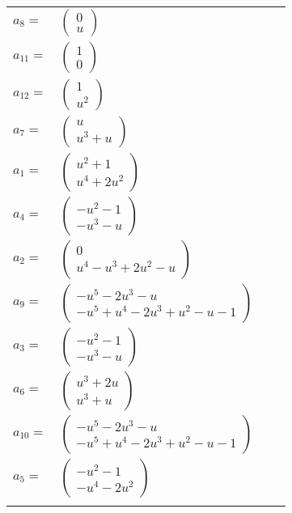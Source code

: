 \documentclass[1p]{elsarticle_modified}
\theoremstyle{definition}
\begin{document}
\begin{tabular}{m{7pt} m{180pt} m{7pt} m{180pt} }
\flushright $a_{8}=$&$\begin{pmatrix}0\\u\end{pmatrix}$ \\
\flushright $a_{11}=$&$\begin{pmatrix}1\\0\end{pmatrix}$ \\
\flushright $a_{12}=$&$\begin{pmatrix}1\\u^2\end{pmatrix}$ \\
\flushright $a_{7}=$&$\begin{pmatrix}u\\u^3+u\end{pmatrix}$ \\
\flushright $a_{1}=$&$\begin{pmatrix}u^2+1\\u^4+2 u^2\end{pmatrix}$ \\
\flushright $a_{4}=$&$\begin{pmatrix}- u^2-1\\- u^3- u\end{pmatrix}$ \\
\flushright $a_{2}=$&$\begin{pmatrix}0\\u^4- u^3+2 u^2- u\end{pmatrix}$ \\
\flushright $a_{9}=$&$\begin{pmatrix}- u^5-2 u^3- u\\- u^5+u^4-2 u^3+u^2- u-1\end{pmatrix}$ \\
\flushright $a_{3}=$&$\begin{pmatrix}- u^2-1\\- u^3- u\end{pmatrix}$ \\
\flushright $a_{6}=$&$\begin{pmatrix}u^3+2 u\\u^3+u\end{pmatrix}$ \\
\flushright $a_{10}=$&$\begin{pmatrix}- u^5-2 u^3- u\\- u^5+u^4-2 u^3+u^2- u-1\end{pmatrix}$ \\
\flushright $a_{5}=$&$\begin{pmatrix}- u^2-1\\- u^4-2 u^2\end{pmatrix}$\\&\end{tabular}
\end{document}

